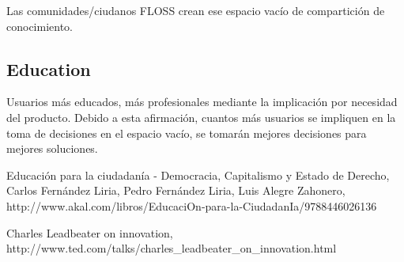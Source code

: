 \documentclass[11pt]{scrartcl}
\begin{document}
Las comunidades/ciudanos FLOSS crean ese espacio vacío de compartición de conocimiento.

\subsection{Education}
\label{sub:education}

Usuarios más educados, más profesionales mediante la implicación por necesidad del producto.
Debido a esta afirmación, cuantos más usuarios se impliquen en la toma de decisiones en el espacio vacío, se tomarán mejores decisiones para mejores soluciones.

\begin{thebibliography}{9}

    Educación para la ciudadanía - Democracia, Capitalismo y Estado de Derecho,\\
    Carlos Fernández Liria, Pedro Fernández Liria, Luis Alegre Zahonero,\\
    http://www.akal.com/libros/EducaciOn-para-la-CiudadanIa/9788446026136

    Charles Leadbeater on innovation,\\
    http://www.ted.com/talks/charles\_leadbeater\_on\_innovation.html
    
\end{thebibliography}
\end{document}
